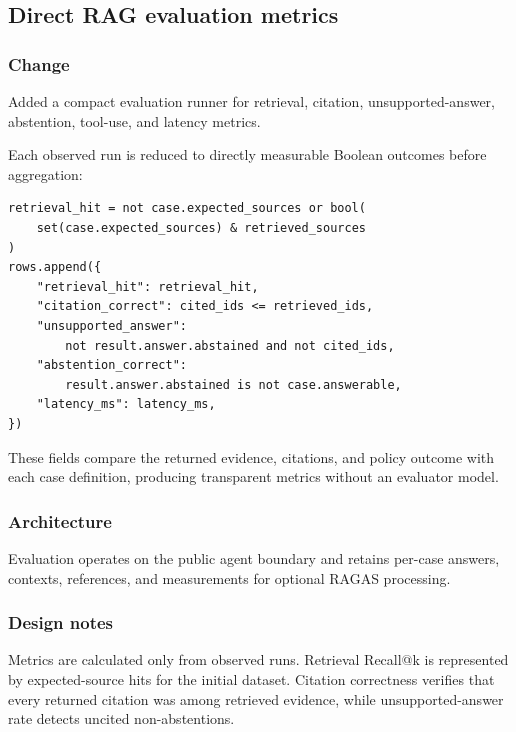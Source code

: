 
\subsection{Direct RAG evaluation metrics}


\subsubsection{Change}

Added a compact evaluation runner for retrieval, citation, unsupported-answer, abstention, tool-use, and latency metrics.

Each observed run is reduced to directly measurable Boolean outcomes before aggregation:

\begin{verbatim}
retrieval_hit = not case.expected_sources or bool(
    set(case.expected_sources) & retrieved_sources
)
rows.append({
    "retrieval_hit": retrieval_hit,
    "citation_correct": cited_ids <= retrieved_ids,
    "unsupported_answer":
        not result.answer.abstained and not cited_ids,
    "abstention_correct":
        result.answer.abstained is not case.answerable,
    "latency_ms": latency_ms,
})
\end{verbatim}

These fields compare the returned evidence, citations, and policy outcome with each case definition, producing transparent metrics without an evaluator model.

\subsubsection{Architecture}

Evaluation operates on the public agent boundary and retains per-case answers, contexts, references, and measurements for optional RAGAS processing.

\subsubsection{Design notes}

Metrics are calculated only from observed runs. Retrieval Recall@k is represented by expected-source hits for the initial dataset. Citation correctness verifies that every returned citation was among retrieved evidence, while unsupported-answer rate detects uncited non-abstentions.

